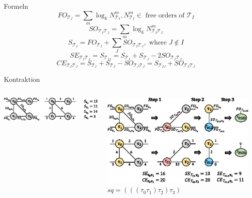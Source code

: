 \documentclass{beamer}
\newcommand{\Tau}{\mathcal{T}}
\begin{document}
\begin{frame}{Formeln}
	\begin{equation}
		FO_{\Tau_I}=\sum\limits_m \log_k N_{\Tau_I}^m, N_{\Tau_I}^m \in \text{ free orders of } \Tau_I
	\end{equation}
	\begin{equation}
		SO_{\Tau_I\Tau_J}=\sum\limits_m \log_k N_{\Tau_I\Tau_J}^m
	\end{equation}
	\begin{equation}
		S_{\Tau_I}=FO_{\Tau_I}+\sum\limits_J SO_{\Tau_I\Tau_J}, \text{ where } J\notin I
	\end{equation}
	\begin{equation}
		SE_{\Tau_I\Tau_J}=S_{\Tau_{IJ}}=S_{\Tau_I}+S_{\Tau_J}-2SO_{\Tau_I\Tau_J}
	\end{equation}
	\begin{equation}
		CE_{\Tau_I\Tau_J}=S_{\Tau_I}+S_{\Tau_J}-SO_{\Tau_I\Tau_J}=S_{\Tau_{IJ}}+SO_{\Tau_I\Tau_J}
	\end{equation}
\end{frame}

\begin{frame}{Kontraktion}
	\begin{columns}
		\begin{column}{0.4\textwidth}
			\includegraphics[scale=.65]{figure_03_a}
		\end{column}
		\begin{column}{0.6\textwidth}
			\includegraphics[scale=.7]{figure_03_b}
			$sq=(((\tau_0\tau_1)\tau_2)\tau_3)$
		\end{column}
	\end{columns}
\end{frame}
\end{document}
